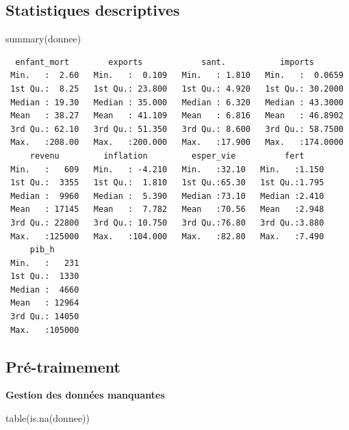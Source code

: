 \documentclass[
]{article}
\newenvironment{Shaded}{}{}
\newcommand{\FunctionTok}[1]{#1}
\newcommand{\NormalTok}[1]{#1}
\begin{document}
\hypertarget{statistiques-descriptives}{%
\subsection{Statistiques descriptives}\label{statistiques-descriptives}}

\begin{Shaded}
\begin{Highlighting}[]
\FunctionTok{summary}\NormalTok{(donnee)}
\end{Highlighting}
\end{Shaded}

\begin{verbatim}
  enfant_mort        exports            sant.           imports        
 Min.   :  2.60   Min.   :  0.109   Min.   : 1.810   Min.   :  0.0659  
 1st Qu.:  8.25   1st Qu.: 23.800   1st Qu.: 4.920   1st Qu.: 30.2000  
 Median : 19.30   Median : 35.000   Median : 6.320   Median : 43.3000  
 Mean   : 38.27   Mean   : 41.109   Mean   : 6.816   Mean   : 46.8902  
 3rd Qu.: 62.10   3rd Qu.: 51.350   3rd Qu.: 8.600   3rd Qu.: 58.7500  
 Max.   :208.00   Max.   :200.000   Max.   :17.900   Max.   :174.0000  
     revenu         inflation         esper_vie          fert      
 Min.   :   609   Min.   : -4.210   Min.   :32.10   Min.   :1.150  
 1st Qu.:  3355   1st Qu.:  1.810   1st Qu.:65.30   1st Qu.:1.795  
 Median :  9960   Median :  5.390   Median :73.10   Median :2.410  
 Mean   : 17145   Mean   :  7.782   Mean   :70.56   Mean   :2.948  
 3rd Qu.: 22800   3rd Qu.: 10.750   3rd Qu.:76.80   3rd Qu.:3.880  
 Max.   :125000   Max.   :104.000   Max.   :82.80   Max.   :7.490  
     pib_h       
 Min.   :   231  
 1st Qu.:  1330  
 Median :  4660  
 Mean   : 12964  
 3rd Qu.: 14050  
 Max.   :105000  
\end{verbatim}

\hypertarget{pruxe9-traimement}{%
\subsection{Pré-traimement}\label{pruxe9-traimement}}

\textbf{Gestion des données manquantes}

\begin{Shaded}
\begin{Highlighting}[]
\FunctionTok{table}\NormalTok{(}\FunctionTok{is.na}\NormalTok{(donnee))}
\end{Highlighting}
\end{Shaded}
\end{document}
